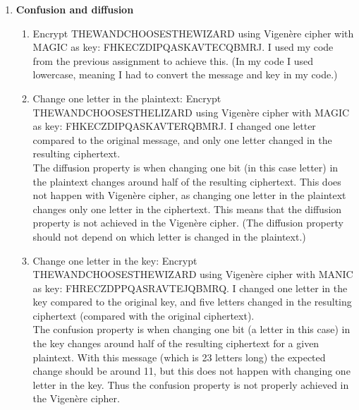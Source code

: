 \documentclass{article}
\begin{document}
	\homeworktitle
	
	\begin{enumerate}[label=\textbf{Task \arabic*:}]
		\item \textbf{Confusion and diffusion}
		\begin{enumerate}[label=\textit{Part \roman*:}]
			\item Encrypt \textsc{THEWANDCHOOSESTHEWIZARD} using Vigenère cipher with \textsc{MAGIC} as key: \textsc{FHKECZDIPQASKAVTECQBMRJ}. I used my code from the previous assignment to achieve this. (In my code I used lowercase, meaning I had to convert the message and key in my code.)
			
			\item Change one letter in the plaintext: Encrypt \textsc{THEWANDCHOOSESTHELIZARD} using Vigenère cipher with \textsc{MAGIC} as key: \textsc{FHKECZDIPQASKAVTERQBMRJ}. I changed one letter compared to the original message, and only one letter changed in the resulting ciphertext.\\
			The diffusion property is when changing one bit (in this case letter) in the plaintext changes around half of the resulting ciphertext. This does not happen with Vigenère cipher, as changing one letter in the plaintext changes only one letter in the ciphertext. This means that the diffusion property is not achieved in the Vigenère cipher. (The diffusion property should not depend on which letter is changed in the plaintext.)
			
			\item Change one letter in the key: Encrypt \textsc{THEWANDCHOOSESTHEWIZARD} using Vigenère cipher with \textsc{MANIC} as key: \textsc{FHRECZDPPQASRAVTEJQBMRQ}. I changed one letter in the key compared to the original key, and five letters changed in the resulting ciphertext (compared with the original ciphertext).\\
			The confusion property is when changing one bit (a letter in this case) in the key changes around half of the resulting ciphertext for a given plaintext. With this message (which is 23 letters long) the expected change should be around 11, but this does not happen with changing one letter in the key. Thus the confusion property is not properly achieved in the Vigenère cipher.	
		\end{enumerate}
		

\end{enumerate}
\end{document}
